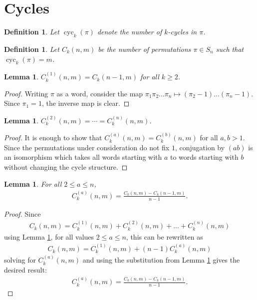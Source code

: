 \documentclass{article}
\newtheorem{definition}[theo]{Definition}
\newtheorem{lemma}[theo]{Lemma}
\begin{document}
  \section{Cycles}
  \begin{definition}
    Let $\operatorname{cyc}_k(\pi)$ denote the number of $k$-cycles in $\pi$.
  \end{definition}
  \begin{definition}
    Let $C_k(n,m)$ be the number of permutations $\pi \in S_n$ such that
    $\operatorname{cyc}_k(\pi) = m$.
  \end{definition}
  \begin{lemma}
    \label{cyc1Recurrence}
    $C_k^{(1)}(n,m) = C_k(n-1, m)$ for all $k \geq 2$.
  \end{lemma}
  \begin{proof}
    Writing $\pi$ as a word, consider the map
    $\pi_1\pi_2\dots\pi_n \mapsto (\pi_2 - 1)\dots(\pi_n - 1)$. Since
    $\pi_1 = 1$, the inverse map is clear.
  \end{proof}
  \begin{lemma}
    \label{allSame}
    $C_k^{(2)}(n,m) = \cdots = C_k^{(n)}(n,m)$.
  \end{lemma}
  \begin{proof}
    It is enough to show that $C_k^{(a)}(n,m) = C_k^{(b)}(n,m)$ for all
    $a, b > 1$. Since the permutations under consideration do not fix $1$,
    conjugation by $(ab)$ is an isomorphism which takes all words starting
    with $a$ to words starting with $b$ without changing the cycle structure.
  \end{proof}
  \begin{lemma}
    \label{cycRecurrenceWithFixedBeginning}
    For all $2 \leq a \leq n$, \begin{align}
      C_k^{(a)}(n,m) = \frac{C_k(n, m) - C_k(n-1, m)}{n - 1}.
    \end{align}
  \end{lemma}
  \begin{proof}
    Since \begin{align}
      C_k(n, m) = C_k^{(1)}(n, m) + C_k^{(2)}(n, m) + \dots + C_k^{(n)}(n, m)
    \end{align} using Lemma \ref{allSame}, for all values $2 \leq a \leq n$,
    this can be rewritten as \begin{align}
      C_k(n, m) = C_k^{(1)}(n, m) + (n-1)C_k^{(a)}(n, m)
    \end{align} solving for $C_k^{(a)}(n, m)$ and using the substitution from Lemma
    \ref{cyc1Recurrence} gives the desired result: \begin{align}
      C_k^{(a)}(n, m) = \frac{C_k(n, m) - C_k(n-1, m)}{n - 1}.
    \end{align}
  \end{proof}
\end{document}
